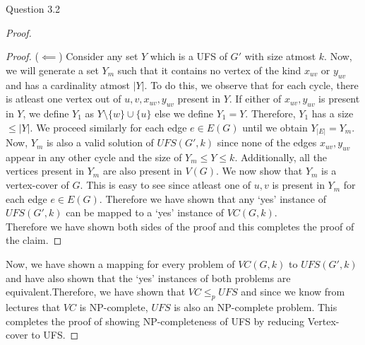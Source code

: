 \begin{solution}{Question 3.2}
\begin{proof}
\begin{proof}
        ($\impliedby$) Consider any set $Y$ which is a UFS of $G'$ with size atmost $k$. Now, we will generate a set $Y_m$ such that it contains no vertex of the kind $x_{uv}$ or $y_{uv}$ and has a cardinality atmost $|Y|$. To do this, we observe that for each cycle, there is atleast one vertex out of $u, v, x_{uv}, y_{uv}$ present in $Y$. If either of $x_{uv}, y_{uv}$ is present in $Y$, we define $Y_1$ as $Y \setminus \{w\} \cup \{u\}$ else we define $Y_1 = Y$. Therefore, $Y_1$ has a size $\leq |Y|$. We proceed similarly for each edge $e \in E(G)$ until we obtain $Y_{|E|} = Y_m$. Now, $Y_m$ is also a valid solution of $UFS(G', k)$ since none of the edges $x_{uv}, y_{uv}$ appear in any other cycle and the size of $Y_m \leq Y \leq k$. Additionally, all the vertices present in $Y_m$ are also present in $V(G)$. We now show that $Y_m$ is a vertex-cover of $G$. This is easy to see since atleast one of $u, v$ is present in $Y_m$ for each edge $e \in E(G)$. Therefore we have shown that any `yes' instance of $UFS(G', k)$ can be mapped to a `yes' instance of $VC(G, k)$.\\
        Therefore we have shown both sides of the proof and this completes the proof of the claim.
      \end{proof}
      Now, we have shown a mapping for every problem of $VC(G, k)$ to $UFS(G', k)$ and have also shown that the `yes' instances of both problems are equivalent.Therefore, we have shown that $VC \leq_p UFS$ and since we know from lectures that $VC$ is NP-complete, $UFS$ is also an NP-complete problem. This completes the proof of showing NP-completeness of UFS by reducing Vertex-cover to UFS.
    \end{proof}
\end{solution}
